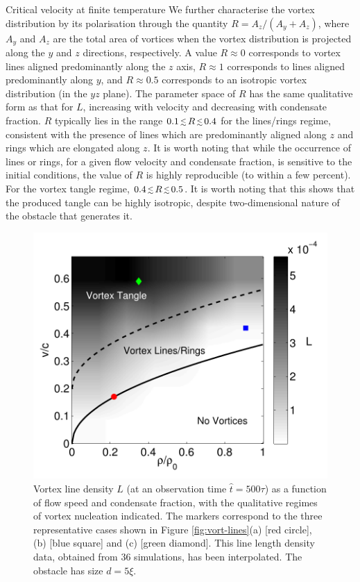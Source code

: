 \begin{chapter}{\label{cha:nonequib}Critical velocity at finite temperature}
We further characterise the vortex distribution by its polarisation through the quantity $R=A_z/(A_y+A_z)$, where $A_y$ and $A_z$ are the total area of vortices when the vortex distribution is projected along the $y$ and $z$ directions, respectively.  A value $R \approx 0$ corresponds to vortex lines aligned predominantly along the $z$ axis, $R\approx 1$ corresponds to lines aligned predominantly along $y$, and $R\approx 0.5$ corresponds to an isotropic vortex distribution (in the $yz$ plane).  The parameter space of $R$ has the same qualitative form as that for $L$, increasing with velocity and decreasing with condensate fraction. $R$ typically lies in the range $0.1 \,\mbox{\footnotesize$\lesssim$}\, R\,\mbox{\footnotesize$\lesssim$}\, 0.4$ for the lines/rings regime, consistent with the presence of lines which are predominantly aligned along $z$ and rings which are elongated along $z$.  It is worth noting that while the occurrence of lines or rings, for a given flow velocity and condensate fraction, is sensitive to the initial conditions, the value of $R$ is highly reproducible (to within a few percent).       For the vortex tangle regime, $0.4 \,\mbox{\footnotesize$\lesssim$}\, R\,\mbox{\footnotesize$\lesssim$}\, 0.5$.  It is worth noting that this shows that the produced tangle can be highly isotropic, despite two-dimensional nature of the obstacle that generates it.

\begin{figure}
  \centering
    \includegraphics[width=0.6\linewidth]{nonequib/figures/vv-interp}
    \caption{\label{fig:vort-vals} Vortex line density $L$ (at an observation time $\hat{t}=500\tau$)  as a function of flow speed and condensate fraction, with the qualitative regimes of vortex nucleation indicated.  The markers correspond to the three representative cases shown in Figure \ref{fig:vort-lines}(a) [red circle], (b) [blue square] and (c) [green diamond].  This line length density data, obtained from 36 simulations, has been interpolated.  The obstacle has size $d=5\xi$.}
\end{figure}


\end{chapter}
